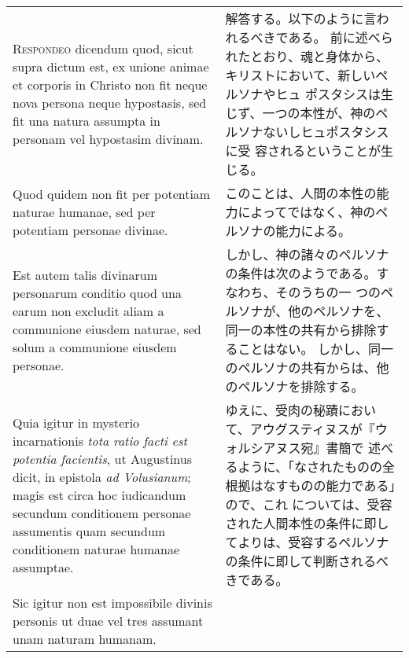 \documentclass[10pt]{jsarticle} %
\begin{document}
\begin{longtable}{p{21em}p{21em}}
\\



{\scshape Respondeo} dicendum quod, sicut supra dictum est, ex unione animae et
corporis in Christo non fit neque nova persona neque hypostasis, sed fit
una natura assumpta in personam vel hypostasim divinam. 

&

解答する。以下のように言われるべきである。
前に述べられたとおり、魂と身体から、キリストにおいて、新しいペルソナやヒュ
 ポスタシスは生じず、一つの本性が、神のペルソナないしヒュポスタシスに受
 容されるということが生じる。

\\


Quod quidem non
fit per potentiam naturae humanae, sed per potentiam personae
divinae. 


&

このことは、人間の本性の能力によってではなく、神のペルソナの能力による。

\\


Est autem talis divinarum personarum conditio quod una earum
non excludit aliam a communione eiusdem naturae, sed solum a communione
eiusdem personae. 

&

しかし、神の諸々のペルソナの条件は次のようである。すなわち、そのうちの一
 つのペルソナが、他のペルソナを、同一の本性の共有から排除することはない。
しかし、同一のペルソナの共有からは、他のペルソナを排除する。


\\


Quia igitur in mysterio incarnationis {\itshape tota ratio facti
est potentia facientis}, ut Augustinus dicit, in epistola {\itshape ad Volusianum};
magis est circa hoc iudicandum secundum conditionem personae assumentis
quam secundum conditionem naturae humanae assumptae. 


&


ゆえに、受肉の秘蹟において、アウグスティヌスが『ウォルシアヌス宛』書簡で
 述べるように、「なされたものの全根拠はなすものの能力である」ので、これ
 については、受容された人間本性の条件に即してよりは、受容するペルソナ
 の条件に即して判断されるべきである。

\\


Sic igitur non est
impossibile divinis personis ut duae vel tres assumant unam naturam
humanam. 





\end{longtable}
\end{document}
